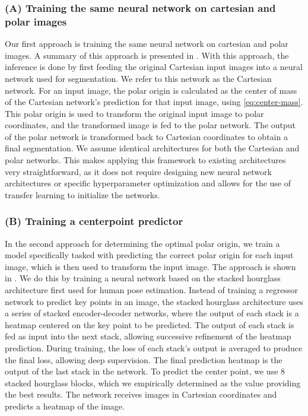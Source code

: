    \subsubsection{(A) Training the same neural network on cartesian and polar images}
   \label{retraining-approach}
   
Our first approach is training the same neural network on cartesian and polar images. A summary of this
approach is presented in . With this approach, 
the inference is done by first feeding the original Cartesian input images into a neural 
network used for segmentation. We refer to this network as the Cartesian network.
For an input image, the polar origin is calculated as the center of mass of the Cartesian network's
prediction for that input image, using \eqref{eq:center-mass}.
This polar origin is used to transform the original input image to polar coordinates, and the transformed 
image is fed
to the polar network. The output of the polar network is transformed back to Cartesian coordinates
to obtain a final segmentation. We assume 
identical architectures for both the Cartesian and polar networks. This makes applying this
framework to existing architectures very straightforward, as it does not require designing new neural 
network architectures or specific hyperparameter optimization and allows for the use of transfer learning to
initialize the networks.
	
    \subsubsection{(B) Training a centerpoint predictor}
    \label{centerpoint-approach}
    
In the second approach for determining the optimal polar origin, we train a model specifically tasked with predicting the correct
polar origin for each input 
image, which is then used to transform the input image. The approach is shown in . 
We do this by training a neural network based on the stacked hourglass architecture 
\cite{newellStackedHourglassNetworks2016} first used for human pose estimation. Instead of training a regressor network to
predict key points in an image, the stacked hourglass architecture uses a series of stacked encoder-decoder networks, where the output
of each stack is a heatmap centered on the key point to be predicted. The output of each stack is fed as input into the next stack, allowing 
successive refinement of the heatmap prediction. During training, the loss of each stack's output is averaged to produce the final loss, 
allowing deep supervision. The final prediction heatmap is the output of the last stack in the network. To predict the center point, 
we use 8 stacked hourglass blocks, which we empirically determined as the value providing the best results. The network receives images in Cartesian 
coordinates and predicts a heatmap of the image.

